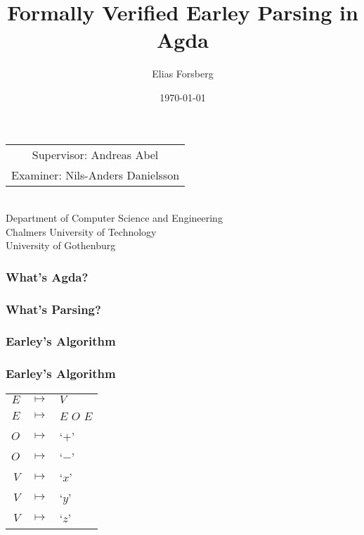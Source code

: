 \documentclass{beamer}
\begin{document}
	\title{Formally Verified Earley Parsing in Agda}
	\author{Elias Forsberg}
	\date{\today}
	
	\begin{frame}
		\maketitle
		\centering
		\begin{tabular}{c}
			Supervisor: Andreas Abel \\ Examiner: Nils-Anders Danielsson
		\end{tabular}\\
		\flushleft
		{\tiny Department of Computer Science and Engineering\\}
		{\tiny \sc Chalmers University of Technology\\}
		{\tiny \sc University of Gothenburg\\}
	
	\end{frame}

	\begin{frame}
		\frametitle{What's Agda?}
	\end{frame}

	\begin{frame}
		\frametitle{What's Parsing?}
	\end{frame}
	
	\begin{frame}
		\frametitle{Earley's Algorithm}
	\end{frame}

	\begin{frame}
		\frametitle{Earley's Algorithm}
		\centering
		\begin{tabular}{rcl}
			$E$ & $ \mapsto $ & $V$ \\
			$E$ & $ \mapsto $ & $E$ $O$ $E$ \\
			$O$ & $ \mapsto $ & `$+$' \\
			$O$ & $ \mapsto $ & `$-$' \\
			$V$ & $ \mapsto $ & `$x$' \\
			$V$ & $ \mapsto $ & `$y$' \\
			$V$ & $ \mapsto $ & `$z$'
		\end{tabular}
	\end{frame}
\end{document}
